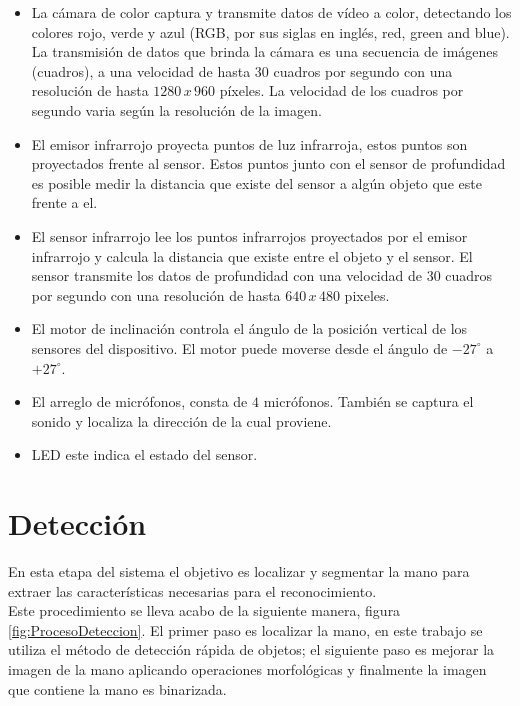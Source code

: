 \begin{itemize}
\item La cámara de color captura y transmite datos de vídeo a color, detectando los colores rojo, verde y azul (RGB, por sus siglas en ingl\'es, red, green and blue). La transmisión de datos que brinda la cámara es una secuencia de imágenes (cuadros), a una velocidad de hasta $30$ cuadros por segundo con una resolución de hasta $1280\, x \, 960$ p\'ixeles. La velocidad de los cuadros por segundo varia según la resolución de la imagen.

\item El emisor infrarrojo proyecta puntos de luz infrarroja, estos puntos son proyectados frente al sensor. Estos puntos junto con el sensor de profundidad es posible medir la distancia que existe del sensor a algún objeto que este frente a el.  

\item El sensor infrarrojo lee los puntos infrarrojos proyectados por el emisor infrarrojo y calcula la distancia que existe entre el objeto y el sensor. El sensor transmite los datos de profundidad con una velocidad de $30$ cuadros por segundo con una resolución de hasta $640 \, x \, 480$ pixeles.   

\item El motor de inclinación controla el \'angulo de la posición vertical de los sensores del dispositivo. El motor puede moverse desde el \'angulo de $-27^ \circ$ a $+27^\circ$.  

\item El arreglo de micrófonos, consta de $4$ micrófonos. También se captura el sonido y localiza la dirección de la cual proviene. 

\item LED este indica el estado del sensor.
\end{itemize}



\section{Detección}\label{sec:Detection}

En esta etapa del sistema el objetivo es localizar y segmentar la mano para extraer las características necesarias para el reconocimiento.\\
Este procedimiento se lleva acabo de la siguiente manera, figura  \ref{fig:ProcesoDeteccion}. El primer paso es localizar la mano, en este trabajo se utiliza el método de detección rápida de objetos; el siguiente paso es mejorar la imagen de la mano aplicando operaciones morfológicas y finalmente la imagen que contiene la mano es binarizada. 

